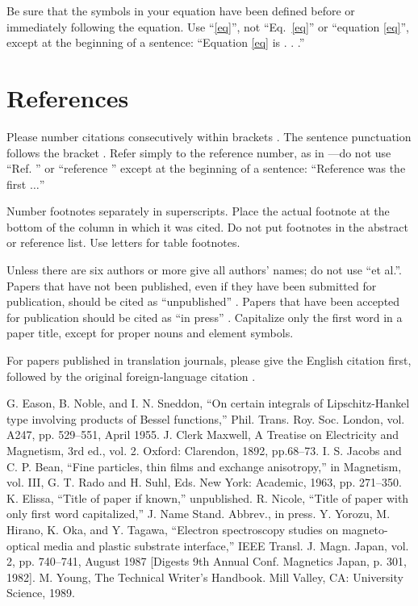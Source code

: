\documentclass[conference]{IEEEtran}
\begin{document}
Be sure that the 
symbols in your equation have been defined before or immediately following 
the equation. Use ``\eqref{eq}'', not ``Eq.~\eqref{eq}'' or ``equation \eqref{eq}'', except at 
the beginning of a sentence: ``Equation \eqref{eq} is . . .''

\section*{References}

Please number citations consecutively within brackets \cite{b1}. The 
sentence punctuation follows the bracket \cite{b2}. Refer simply to the reference 
number, as in \cite{b3}---do not use ``Ref. \cite{b3}'' or ``reference \cite{b3}'' except at 
the beginning of a sentence: ``Reference \cite{b3} was the first $\ldots$''

Number footnotes separately in superscripts. Place the actual footnote at 
the bottom of the column in which it was cited. Do not put footnotes in the 
abstract or reference list. Use letters for table footnotes.

Unless there are six authors or more give all authors' names; do not use 
``et al.''. Papers that have not been published, even if they have been 
submitted for publication, should be cited as ``unpublished'' \cite{b4}. Papers 
that have been accepted for publication should be cited as ``in press'' \cite{b5}. 
Capitalize only the first word in a paper title, except for proper nouns and 
element symbols.

For papers published in translation journals, please give the English 
citation first, followed by the original foreign-language citation \cite{b6}.

\begin{thebibliography}{00}
 G. Eason, B. Noble, and I. N. Sneddon, ``On certain integrals of Lipschitz-Hankel type involving products of Bessel functions,'' Phil. Trans. Roy. Soc. London, vol. A247, pp. 529--551, April 1955.
 J. Clerk Maxwell, A Treatise on Electricity and Magnetism, 3rd ed., vol. 2. Oxford: Clarendon, 1892, pp.68--73.
 I. S. Jacobs and C. P. Bean, ``Fine particles, thin films and exchange anisotropy,'' in Magnetism, vol. III, G. T. Rado and H. Suhl, Eds. New York: Academic, 1963, pp. 271--350.
 K. Elissa, ``Title of paper if known,'' unpublished.
 R. Nicole, ``Title of paper with only first word capitalized,'' J. Name Stand. Abbrev., in press.
 Y. Yorozu, M. Hirano, K. Oka, and Y. Tagawa, ``Electron spectroscopy studies on magneto-optical media and plastic substrate interface,'' IEEE Transl. J. Magn. Japan, vol. 2, pp. 740--741, August 1987 [Digests 9th Annual Conf. Magnetics Japan, p. 301, 1982].
 M. Young, The Technical Writer's Handbook. Mill Valley, CA: University Science, 1989.
\end{thebibliography}
\vspace{12pt}
\end{document}

